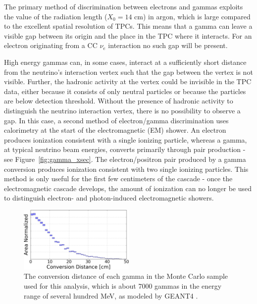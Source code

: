 The primary method of discrimination between electrons and gammas exploits the value of the radiation length ($X_0 = 14$ cm) in argon, which is large compared to the excellent spatial resolution of TPCs. This means that a gamma can leave a visible gap between its origin and the place in the TPC where it interacts.  For an electron originating from a CC $\nu_e$ interaction no such gap will be present.

High energy gammas can, in some cases, interact at a sufficiently short distance from the neutrino's interaction vertex such that the gap between the vertex is not visible.  Further, the hadronic activity at the vertex could be invisible in the TPC data, either because it consists of only neutral particles or because the particles are below detection threshold.  Without the presence of hadronic activity to distinguish the neutrino interaction vertex, there is no possibility to observe a gap.  In this case, a second method of electron/gamma discrimination uses calorimetry at the start of the electromagnetic (EM) shower.  An electron produces ionization consistent with a single ionizing particle, whereas a gamma, at typical neutrino beam energies, converts primarily through pair production - see Figure~\ref{fig:gamma_xsec}.  The electron/positron pair produced by a gamma conversion produces ionization consistent with two single ionizing particles.  This method is only useful for the first few centimeters of the cascade - once the electromagnetic cascade develops, the amount of ionization can no longer be used to distinguish electron- and photon-induced electromagnetic showers.




\begin{figure}[h!]
  \centering
  \includegraphics[width=0.5\textwidth]{emshower_figures/photon_conversion_dist_trimmed.png}
  \caption[Photon Conversion Distance]{The conversion distance of each gamma in the Monte Carlo sample used for this analysis, which is about 7000 gammas in the energy range of several hundred MeV, as modeled by GEANT4 \cite{Agostinelli:2002hh}.}
  \label{fig:photon_conversion_dist}
\end{figure}

